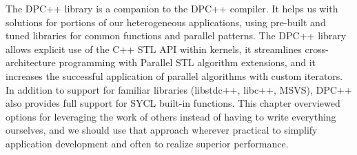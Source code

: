 
The DPC++ library is a companion to the DPC++ compiler. It helps us with solutions for portions of our heterogeneous applications, using pre-built and tuned libraries for common functions and parallel patterns. The DPC++ library allows explicit use of the C++ STL API within kernels, it streamlines cross-architecture programming with Parallel STL algorithm extensions, and it increases the successful application of parallel algorithms with custom iterators. In addition to support for familiar libraries (libstdc++, libc++, MSVS), DPC++ also provides full support for SYCL built-in functions. This chapter overviewed options for leveraging the work of others instead of having to write everything ourselves, and we should use that approach wherever practical to simplify application development and often to realize superior performance.\par


\newpage